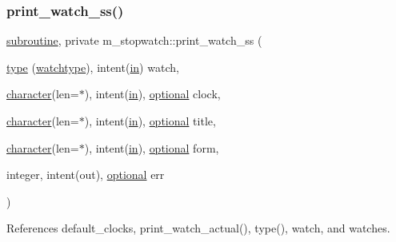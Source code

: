 \subsubsection{\texorpdfstring{print\+\_\+watch\+\_\+ss()}{print\_watch\_ss()}}
{\footnotesize\ttfamily \hyperlink{M__stopwatch_83_8txt_acfbcff50169d691ff02d4a123ed70482}{subroutine}, private m\+\_\+stopwatch\+::print\+\_\+watch\+\_\+ss (\begin{DoxyParamCaption}\item[{\hyperlink{stop__watch_83_8txt_a70f0ead91c32e25323c03265aa302c1c}{type} (\hyperlink{structm__stopwatch_1_1watchtype}{watchtype}), intent(\hyperlink{M__journal_83_8txt_afce72651d1eed785a2132bee863b2f38}{in})}]{watch,  }\item[{\hyperlink{option__stopwatch_83_8txt_abd4b21fbbd175834027b5224bfe97e66}{character}(len=$\ast$), intent(\hyperlink{M__journal_83_8txt_afce72651d1eed785a2132bee863b2f38}{in}), \hyperlink{option__stopwatch_83_8txt_aa4ece75e7acf58a4843f70fe18c3ade5}{optional}}]{clock,  }\item[{\hyperlink{option__stopwatch_83_8txt_abd4b21fbbd175834027b5224bfe97e66}{character}(len=$\ast$), intent(\hyperlink{M__journal_83_8txt_afce72651d1eed785a2132bee863b2f38}{in}), \hyperlink{option__stopwatch_83_8txt_aa4ece75e7acf58a4843f70fe18c3ade5}{optional}}]{title,  }\item[{\hyperlink{option__stopwatch_83_8txt_abd4b21fbbd175834027b5224bfe97e66}{character}(len=$\ast$), intent(\hyperlink{M__journal_83_8txt_afce72651d1eed785a2132bee863b2f38}{in}), \hyperlink{option__stopwatch_83_8txt_aa4ece75e7acf58a4843f70fe18c3ade5}{optional}}]{form,  }\item[{integer, intent(out), \hyperlink{option__stopwatch_83_8txt_aa4ece75e7acf58a4843f70fe18c3ade5}{optional}}]{err }\end{DoxyParamCaption})\hspace{0.3cm}{\ttfamily [private]}}



References default\+\_\+clocks, print\+\_\+watch\+\_\+actual(), type(), watch, and watches.

\mbox{\label{namespacem__stopwatch_a528d4073fce87b4e438a9cfbe0f12549}} 
